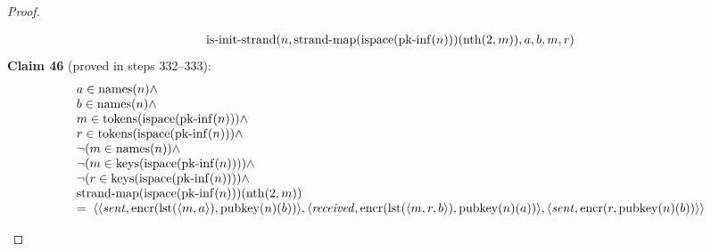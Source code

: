 \documentclass[11pt]{article}
\theoremstyle{plain}
\begin{document}
\begin{proof}
\begin{itemize}[leftmargin=2.8em, itemsep=4pt, parsep=1pt]
\begin{itemize}[leftmargin=2.8em, itemsep=4pt, parsep=1pt]
\begin{equation*}
\begin{array}{@{}l@{}}
\operatorname{is\text{-}init\text{-}strand}(n, \operatorname{strand\text{-}map}(\operatorname{ispace}(\operatorname{pk\text{-}inf}(n)))(\operatorname{nth}(2, m)), a, b, m, r)
\end{array}
\end{equation*}
\textbf{Claim 46} (proved in steps 332--333):
\begin{equation*}
\begin{array}{@{}l@{}} a \in \operatorname{names}(n) \wedge \\ b \in \operatorname{names}(n) \wedge \\ m \in \operatorname{tokens}(\operatorname{ispace}(\operatorname{pk\text{-}inf}(n))) \wedge \\ r \in \operatorname{tokens}(\operatorname{ispace}(\operatorname{pk\text{-}inf}(n))) \wedge \\ \neg (m \in \operatorname{names}(n)) \wedge \\ \neg (m \in \operatorname{keys}(\operatorname{ispace}(\operatorname{pk\text{-}inf}(n)))) \wedge \\ \neg (r \in \operatorname{keys}(\operatorname{ispace}(\operatorname{pk\text{-}inf}(n)))) \wedge \\ \operatorname{strand\text{-}map}(\operatorname{ispace}(\operatorname{pk\text{-}inf}(n)))(\operatorname{nth}(2, m)) \\ =\; \langle \langle \mathit{sent}, \operatorname{encr}(\operatorname{lst}(\langle m, a \rangle), \operatorname{pubkey}(n)(b)) \rangle, \langle \mathit{received}, \operatorname{encr}(\operatorname{lst}(\langle m, r, b \rangle), \operatorname{pubkey}(n)(a)) \rangle, \langle \mathit{sent}, \operatorname{encr}(r, \operatorname{pubkey}(n)(b)) \rangle \rangle \end{array}
\end{equation*}


\end{itemize}
\end{itemize}
\end{proof}
\end{document}
